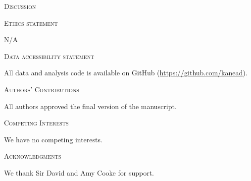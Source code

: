 \documentclass[12pt,letterpaper]{article}
\renewcommand{\section}[1]{%
\bigskip
\begin{center}
\begin{Large}
\normalfont\scshape #1
\medskip
\end{Large}
\end{center}}
\begin{document}
%
%

\section{Discussion}

\section{Ethics statement}
N/A
\section{Data accessibility statement}
All data and analysis code is available on GitHub (\url{https://github.com/kanead}).
\section{Authors' Contributions}
All authors approved the final version of the manuscript.
\section{Competing Interests}
We have no competing interests.
\section{Acknowledgments}
We thank Sir David and Amy Cooke for support.




\end{document}
